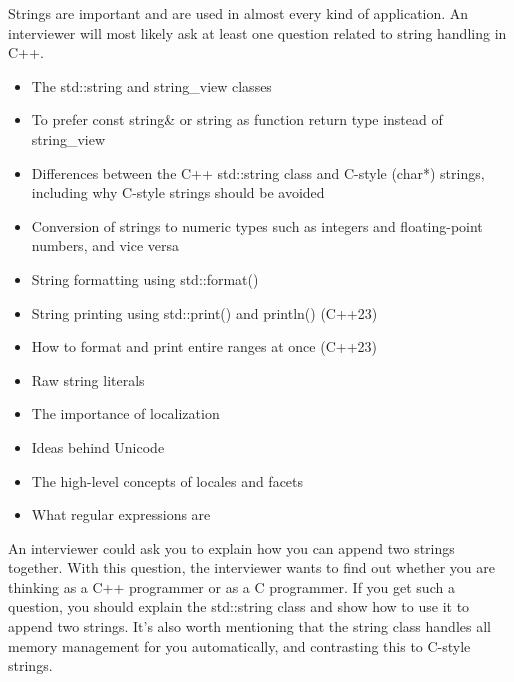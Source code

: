 

Strings are important and are used in almost every kind of application. An interviewer will most likely ask at least one question related to string handling in C++.


\begin{itemize}
\item
The std::string and string\_view classes

\item
To prefer const string\& or string as function return type instead of string\_view

\item
Differences between the C++ std::string class and C-style (char*) strings, including why C-style strings should be avoided

\item
Conversion of strings to numeric types such as integers and floating-point numbers, and vice versa

\item
String formatting using std::format()

\item
String printing using std::print() and println() (C++23)

\item
How to format and print entire ranges at once (C++23)

\item
Raw string literals

\item
The importance of localization

\item
Ideas behind Unicode

\item
The high-level concepts of locales and facets

\item
What regular expressions are
\end{itemize}


An interviewer could ask you to explain how you can append two strings together. With this question, the interviewer wants to find out whether you are thinking as a C++ programmer or as a C programmer. If you get such a question, you should explain the std::string class and show how to use it to append two strings. It’s also worth mentioning that the string class handles all memory management for you automatically, and contrasting this to C-style strings.

